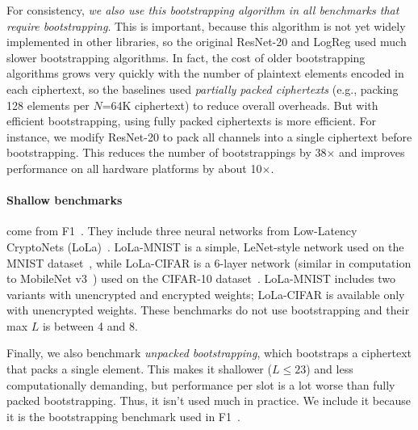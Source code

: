 For consistency, \emph{we also use this bootstrapping algorithm in all benchmarks that require bootstrapping}.
This is important, because this algorithm is not yet widely implemented in other libraries,
so the original ResNet-20 and LogReg used much slower bootstrapping algorithms.
In fact, the cost of older bootstrapping algorithms grows very quickly with the number of plaintext elements
encoded in each ciphertext, so the baselines used \emph{partially packed ciphertexts}
(e.g., packing 128 elements per $N$=64K ciphertext) to reduce overall overheads.
But with efficient bootstrapping, using fully packed ciphertexts is more efficient.
For instance, we modify ResNet-20 to pack all channels into a single 
ciphertext before bootstrapping. This reduces the number of bootstrappings by 38$\times$ %
and improves performance on all hardware platforms by about 10$\times$. 

\paragraph{Shallow benchmarks} come from F1~\cite{feldmann:micro21:f1}. They include three neural networks from Low-Latency CryptoNets 
(LoLa)~\cite{brutzkus:icml19:low}.
LoLa-MNIST is a simple, LeNet-style network used on the MNIST 
dataset~\cite{lecunn:ieee98:gradient-document},
while LoLa-CIFAR is a 6-layer network (similar in computation to MobileNet v3~\cite{howard2019searching})
used on the CIFAR-10 dataset~\cite{cifar10}.
LoLa-MNIST includes two variants with unencrypted and encrypted weights;
LoLa-CIFAR is available only with unencrypted weights.
These benchmarks do not use bootstrapping and their max $L$ is between 4 and 8.

Finally, we also benchmark \emph{unpacked bootstrapping}, which bootstraps a ciphertext 
that packs a single element.
This makes it shallower ($L{\leq}23$) and less computationally demanding,
but performance per slot is a lot worse than fully packed bootstrapping. Thus,
it isn't used much in practice. We include it because it is the bootstrapping
benchmark used in F1~\cite{feldmann:micro21:f1}.


